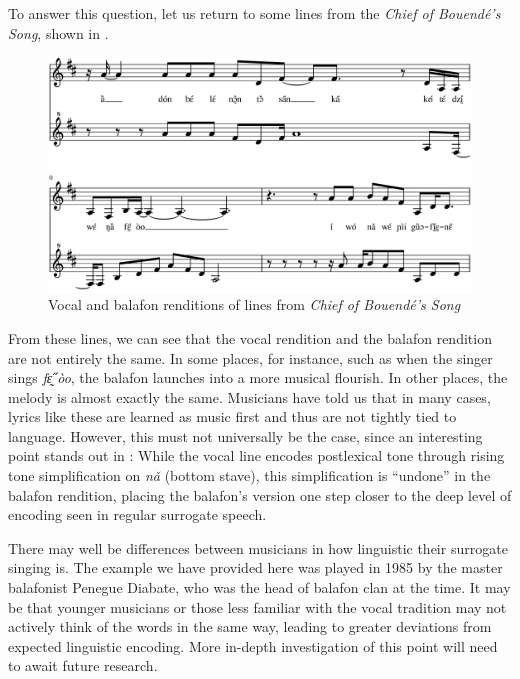\documentclass[output=paper]{langscibook}
\begin{document}
To answer this question, let us return to some lines from the \textit{Chief of Bouendé's Song}, shown in . 

\begin{figure}
\includegraphics[scale=.37, angle=90]{figures/voice-balafon-comparison.eps}
\caption{Vocal and balafon renditions of lines from \textit{Chief of Bouendé's Song}\label{fig:mcpherson:Bouende}} 
\end{figure}

From these lines, we can see that the vocal rendition and the balafon rendition are not entirely the same. In some places, for instance, such as when the singer sings \textit{fɛ̰̋ òo}, the balafon launches into a more musical flourish. In other places, the melody is almost exactly the same. Musicians have told us that in many cases, lyrics like these are learned as music first and thus are not tightly tied to language. However, this must not universally be the case, since an interesting point stands out in : While the vocal line encodes postlexical tone through rising tone simplification on \textit{nǎ} (bottom stave), this simplification is ``undone'' in the balafon rendition, placing the balafon's version one step closer to the deep level of encoding seen in regular surrogate speech. 

There may well be differences between musicians in how linguistic their surrogate singing is. The example we have provided here was played in 1985 by the master balafonist Penegue Diabate, who was the head of balafon clan at the time. It may be that younger musicians or those less familiar with the vocal tradition may not actively think of the words in the same way, leading to greater deviations from expected linguistic encoding. More in-depth investigation of this point will need to await future research. 
\end{document}
